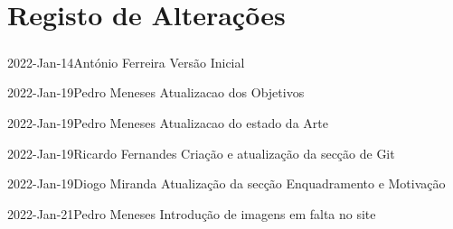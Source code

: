 \chapter*{Registo de Alterações}
\paragraph{}

\begin{logentry}{2022-Jan-14}{António Ferreira}
Versão Inicial
\end{logentry}

\begin{logentry}{2022-Jan-19}{Pedro Meneses}
Atualizacao dos Objetivos
\end{logentry}

\begin{logentry}{2022-Jan-19}{Pedro Meneses}
Atualizacao do estado da Arte
\end{logentry}

\begin{logentry}{2022-Jan-19}{Ricardo Fernandes}
Criação e atualização da secção de Git
\end{logentry}

\begin{logentry}{2022-Jan-19}{Diogo Miranda}
Atualização da secção Enquadramento e Motivação
\end{logentry}

\begin{logentry}{2022-Jan-21}{Pedro Meneses}
Introdução de imagens em falta no site
\end{logentry}

